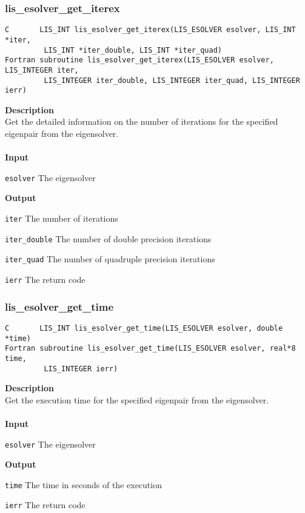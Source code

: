 \documentclass[a4paper]{article}
\newcommand{\namelistlabel}[1]{\mbox{#1}\hfill}
\newenvironment{namelist}[1]{%
\begin{list}{}
  {\let\makelabel\namelistlabel
  \settowidth{\labelwidth}{#1}
  \setlength{\leftmargin}{1.1\labelwidth}}
  }{%
\end{list}}
\begin{document}
\newpage
\subsubsection{lis\_esolver\_get\_iterex}
\begin{screen}
\verb|C       LIS_INT lis_esolver_get_iterex(LIS_ESOLVER esolver, LIS_INT *iter,|\\
\verb|         LIS_INT *iter_double, LIS_INT *iter_quad)|\\
\verb|Fortran subroutine lis_esolver_get_iterex(LIS_ESOLVER esolver, LIS_INTEGER iter,|\\
\verb|         LIS_INTEGER iter_double, LIS_INTEGER iter_quad, LIS_INTEGER ierr)|
\end{screen}
{\bf Description}\\
\indent
Get the detailed information on the number of iterations for the specified eigenpair from the eigensolver.
\\ \\
\noindent
{\bf Input}
\begin{namelist}{XXXXXXXXXXXXXXXXXXXX}
\item[\tt esolver] The eigensolver
\end{namelist}
{\bf Output}
\begin{namelist}{XXXXXXXXXXXXXXXXXXXX}
\item[\tt iter] The number of iterations
\item[\tt iter\_double] The number of double precision iterations
\item[\tt iter\_quad] The number of quadruple precision iterations
\item[\tt ierr] The return code
\end{namelist}

\subsubsection{lis\_esolver\_get\_time}
\begin{screen}
\verb|C       LIS_INT lis_esolver_get_time(LIS_ESOLVER esolver, double *time)|\\
\verb|Fortran subroutine lis_esolver_get_time(LIS_ESOLVER esolver, real*8 time,|\\
\verb|         LIS_INTEGER ierr)|
\end{screen}
{\bf Description}\\
\indent
Get the execution time for the specified eigenpair from the eigensolver.
\\ \\
\noindent
{\bf Input}
\begin{namelist}{XXXXXXXXXXXXXXXXXXXX}
\item[\tt esolver] The eigensolver
\end{namelist}
{\bf Output}
\begin{namelist}{XXXXXXXXXXXXXXXXXXXX}
\item[\tt time] The time in seconds of the execution
\item[\tt ierr] The return code
\end{namelist}
\end{document}
